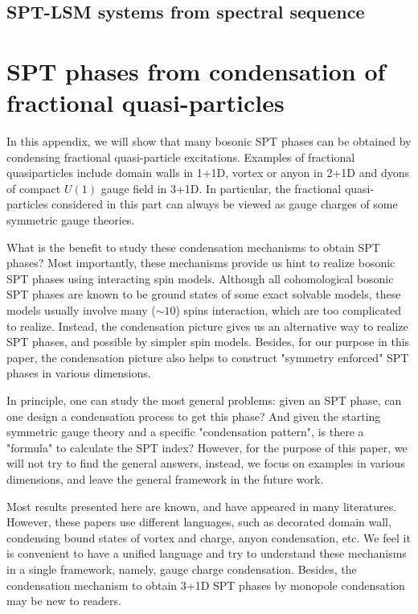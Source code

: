 \documentclass[reprint,amsmath,amssymb,aps,pra,]{revtex4-1}
\begin{document}
\subsection{SPT-LSM systems from spectral sequence}


\section{SPT phases from condensation of fractional quasi-particles}\label{app:SPT_condensation}
In this appendix, we will show that many bosonic SPT phases can be obtained by condensing fractional quasi-particle excitations.
Examples of fractional quasiparticles include domain walls in 1+1D, vortex or anyon in 2+1D and dyons of compact $U(1)$ gauge field in 3+1D.
In particular, the fractional quasi-particles considered in this part can always be viewed as gauge charges of some symmetric gauge theories.

What is the benefit to study these condensation mechanisms to obtain SPT phases?
Most importantly, these mechanisms provide us hint to realize bosonic SPT phases using interacting spin models.
Although all cohomological bosonic SPT phases are known to be ground states of some exact solvable models, these models usually involve many ($\sim 10$) spins interaction, which are too complicated to realize.
Instead, the condensation picture gives us an alternative way to realize SPT phases, and possible by simpler spin models.
Besides, for our purpose in this paper, the condensation picture also helps to construct "symmetry enforced" SPT phases in various dimensions.

In principle, one can study the most general problems: given an SPT phase, can one design a condensation process to get this phase?
And given the starting symmetric gauge theory and a specific "condensation pattern", is there a "formula" to calculate the SPT index?
However, for the purpose of this paper, we will not try to find the general answers, instead, we focus on examples in various dimensions, and leave the general framework in the future work.

Most results presented here are known, and have appeared in many literatures\cite{SenthilLevin2013,GeraedtsMotrunich2013,RegnaultSenthil2013,FurukawaUeda2013,WuJain2013,YeWen2014,LiuGuWen2014,ChenLuVishwanath2014,GeraedtsMotrunich2014,HeBhattacharjeeMoessnerPollmann2015,SterdyniakCooperRegnault2015,JiangRan2017,YangJiangVishwanathRan2018}.
However, these papers use different languages, such as decorated domain wall, condensing bound states of vortex and charge, anyon condensation, etc.
We feel it is convenient to have a unified language and try to understand these mechanisms in a single framework, namely, gauge charge condensation.
Besides, the condensation mechanism to obtain 3+1D SPT phases by monopole condensation may be new to readers.
\end{document}
